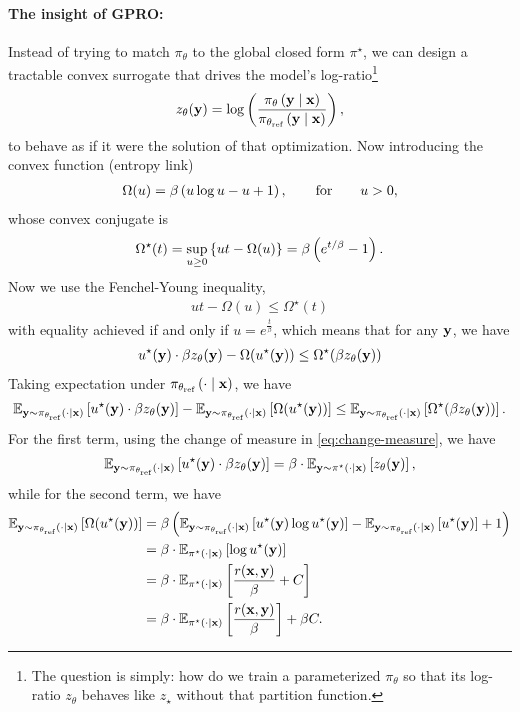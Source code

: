 \documentclass[11pt]{article}  %
\begin{document}
\paragraph{The insight of GPRO:}
Instead of trying to match $\pi_{\theta}$ to the global closed form $\pi^\star$, we can design a tractable convex surrogate that drives the model's log-ratio\footnote{The question is simply: how do we train a parameterized $\pi_\theta$ so that its log-ratio $z_{\theta}$ behaves like $z_\star$ without that partition function.} 
\begin{align*}
  z_{\theta}(\mathbf{y}) = \log \left( \frac{\pi_{\theta}\left( \mathbf{y} \mid \mathbf{x} \right)}{\pi_{\theta_{\text{ref}}}\left( \mathbf{y} \mid \mathbf{x} \right)} \right),
\end{align*}
to behave as if it were the solution of that optimization.
Now introducing the convex function (entropy link) 
\begin{align*}
  \Omega(u) = \beta\left( u \log u - u + 1 \right), \qquad \text{for} \qquad u > 0,
\end{align*}
whose convex conjugate is 
\begin{align*}
  \Omega^\star(t) = \sup_{u \geq 0}\left\{ ut - \Omega(u) \right\} = \beta \left( e^{t/\beta} - 1 \right).
\end{align*}
Now we use the Fenchel-Young inequality, 
\begin{align*}
  ut - \Omega(u) \leq \Omega^\star(t)
\end{align*}
with equality achieved if and only if $u = e^{\frac{t}{\beta}}$, which means that for any $\mathbf{y}$, we have 
\begin{align*}
  u^\star(\mathbf{y})\cdot\beta z_{\theta}(\mathbf{y}) - \Omega(u^\star(\mathbf{y})) \leq \Omega^\star(\beta z_{\theta}(\mathbf{y}))
\end{align*}
Taking expectation under $\pi_{\theta_{\text{ref}}}\left( \cdot \mid \mathbf{x} \right)$, we have 
\begin{align}
  \label{eq:org-1}
  \mathbb{E}_{\mathbf{y} \sim \pi_{\theta_{\text{ref}}}\left( \cdot \mid \mathbf{x} \right)}\left[u^\star(\mathbf{y})\cdot\beta z_{\theta}(\mathbf{y})\right] - \mathbb{E}_{\mathbf{y} \sim \pi_{\theta_{\text{ref}}}\left( \cdot \mid \mathbf{x} \right)}\left[\Omega(u^\star(\mathbf{y}))\right] \leq \mathbb{E}_{\mathbf{y} \sim \pi_{\theta_{\text{ref}}}\left( \cdot \mid \mathbf{x} \right)}\left[\Omega^\star(\beta z_{\theta}(\mathbf{y}))\right].
\end{align}
For the first term, using the change of measure in \eqref{eq:change-measure}, we have
\begin{align*}
  \mathbb{E}_{\mathbf{y} \sim \pi_{\theta_{\text{ref}}}\left( \cdot \mid \mathbf{x} \right)}\left[u^\star(\mathbf{y})\cdot\beta z_{\theta}(\mathbf{y})\right] = \beta \cdot \mathbb{E}_{\mathbf{y} \sim \pi^\star(\cdot \mid \mathbf{x})}\left[z_{\theta}(\mathbf{y})\right],
\end{align*}
while for the second term, we have
\begin{align*}
  \mathbb{E}_{\mathbf{y} \sim \pi_{\theta_{\text{ref}}}\left( \cdot \mid \mathbf{x} \right)}\left[\Omega(u^\star(\mathbf{y}))\right] &= \beta \left( \mathbb{E}_{\mathbf{y} \sim \pi_{\theta_{\text{ref}}}\left( \cdot \mid \mathbf{x} \right)}\left[u^\star(\mathbf{y})\log u^\star(\mathbf{y})\right] - \mathbb{E}_{\mathbf{y} \sim \pi_{\theta_{\text{ref}}}\left( \cdot \mid \mathbf{x} \right)}\left[u^\star(\mathbf{y})\right] + 1 \right) \\
  &= \beta\cdot\mathbb{E}_{\pi^\star(\cdot\mid \mathbf{x})}\left[\log u^\star(\mathbf{y})\right] \\
  &= \beta\cdot \mathbb{E}_{\pi^\star(\cdot\mid \mathbf{x})}\left[\frac{r(\mathbf{x}, \mathbf{y})}{\beta} +  C\right] \\
  &= \beta\cdot \mathbb{E}_{\pi^\star(\cdot\mid \mathbf{x})}\left[\frac{r(\mathbf{x}, \mathbf{y})}{\beta}\right] + \beta C.
\end{align*}
\end{document}
